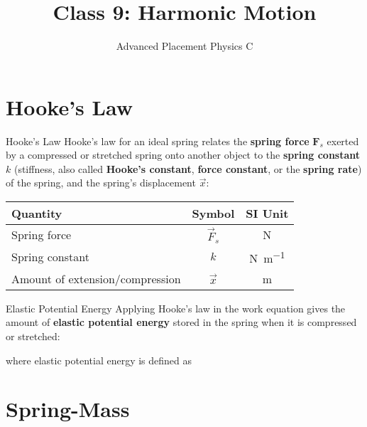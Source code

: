 \documentclass[12pt,compress,aspectratio=169]{beamer}
\title{Class 9: Harmonic Motion}
\subtitle{Advanced Placement Physics C}
\begin{document}
\begin{frame}
  \maketitle
\end{frame}


\section{Hooke's Law}

\begin{frame}{Hooke's Law}
  Hooke's law for an ideal spring relates the \textbf{spring force} $\bm F_s$
  exerted by a compressed or stretched spring onto another object to the
  \textbf{spring constant} $k$ (stiffness, also called \textbf{Hooke's
    constant}, \textbf{force constant}, or the \textbf{spring rate}) of the
  spring, and the spring's displacement $\vec x$:

  \begin{center}
    \begin{tabular}{l|c|c}
      \rowcolor{pink}
      \textbf{Quantity} & \textbf{Symbol} & \textbf{SI Unit} \\ \hline
      Spring force                    & $\vec F_s$ & \si\newton \\
      Spring constant                 & $k$        & \si{\newton\per\metre}\\
      Amount of extension/compression & $\vec x$   & \si\metre
    \end{tabular}
  \end{center}
\end{frame}



\begin{frame}{Elastic Potential Energy}
  Applying Hooke's law in the work equation gives the amount of 
  \textbf{elastic potential energy} stored in the spring when it is
  compressed or stretched:


  where elastic potential energy is defined as

\end{frame}



\section{Spring-Mass}
\end{document}
